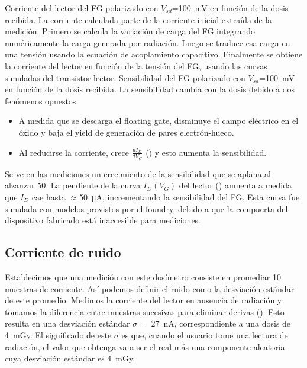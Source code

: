 {Corriente del lector del FG polarizado con
    $V_{sd}$=\SI{100}{\milli\volt} en función de la dosis recibida.
La corriente calculada parte de la corriente inicial extraída de la
medición.
Primero se calcula la variación de carga del FG 
integrando numéricamente la carga generada por radiación.
Luego se traduce esa carga en una tensión
usando la ecuación de acoplamiento capacitivo.
Finalmente se obtiene la corriente del lector
en función de la tensión del FG,
usando las curvas simuladas del transistor lector.}
{Sensibilidad del FG polarizado con
    $V_{sd}$=\SI{100}{\milli\volt} en función de la dosis recibida.
}
La sensibilidad cambia con la dosis debido a dos fenómenos opuestos.
\begin{itemize}
    \item A medida que se descarga el floating gate, disminuye el 
        campo eléctrico en el óxido y baja el yield de generación de pares 
        electrón-hueco.
    \item Al reducirse la corriente, crece $\frac{dI_D}{dV_G}$ 
        () y esto aumenta la sensibilidad.
\end{itemize}
Se ve en las mediciones un crecimiento de la sensibilidad que se aplana al
alzanzar \SI{50}{\Gray}.
{La pendiente de la curva $I_D(V_G)$ del lector () 
aumenta a medida que $I_D$ cae hasta $\approx$\SI{50}{\micro\ampere}, 
incrementando la sensibilidad del FG.
Esta curva fue simulada con modelos provistos por el foundry,
debido a que la compuerta del dispositivo fabricado está inaccesible para
mediciones.}
\subsection{Corriente de ruido}
Establecimos que una medición con este dosímetro consiste en promediar 10
muestras de corriente.
Así podemos definir el ruido como la desviación estándar de este promedio.
Medimos la corriente del lector en ausencia de radiación y
tomamos la diferencia entre muestras sucesivas para eliminar derivas
().
Esto resulta en una desviación estándar
$\sigma=$ \SI{27}{\nano\ampere},
correspondiente a una dosis de \SI{4}{\milli\gray}.
El significado de este $\sigma$ es que,
cuando el usuario tome una lectura de radiación,
el valor que obtenga va a ser el real más una componente aleatoria
cuya desviación estándar es \SI{4}{\milli\gray}.
